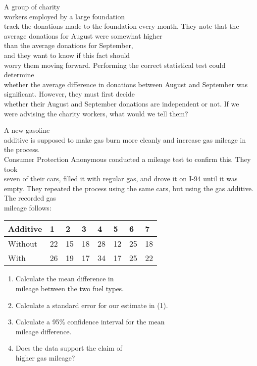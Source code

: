 \documentclass[11pt]{book}\usepackage[]{graphicx}\usepackage[]{color}
\begin{document}
\begin{exercises}
\begin{exercise}
A group of charity \\ workers employed by a large foundation \\ track the donations made to the foundation every  month. They note that the average donations for August were somewhat higher \\ than the average donations for September, \\ and they want to know if this fact should \\ worry them moving forward. Performing the correct statistical test could determine \\ whether the average difference in donations between  August and  September was significant. However, they  must first decide \\ whether their August and  September donations are independent or not. If we were advising the charity workers, what would we tell them?
\end{exercise}
\begin{solution}  %


\end{solution}

\begin{exercise}  %

A new gasoline \\ additive is supposed to make gas burn more cleanly and increase gas mileage in the process.  \\ Consumer Protection Anonymous conducted a mileage test to confirm this.  They took \\ seven of their cars, filled it with regular gas, and drove it on I-94 until it was empty.  They repeated the process using the same cars, but using the gas additive.  The recorded gas \\ mileage follows:

{\footnotesize{
\begin{tabular}{@{} llllllll @{}} \hline
Additive & 1 & 2 & 3 & 4 & 5 & 6 & 7 \\ \hline
Without & 22 & 15 & 18 & 28 & 12 & 25 & 18 \\
With    & 26 & 19 & 17 & 34 & 17 & 25 & 22 \\ \hline
\end{tabular}
}}

\begin{enumerate}
  \item Calculate the mean difference in \\ mileage between the two fuel types.         \item Calculate a standard error for our estimate in (1).
  \item Calculate a 95\% confidence interval for the mean \\ mileage difference.
  \item Does the data support the claim of \\ higher gas mileage?
\end{enumerate}


\end{exercise}
\end{exercises}
\end{document}
